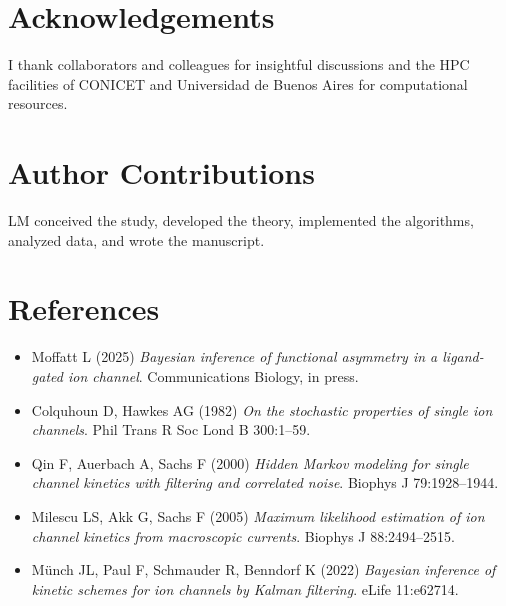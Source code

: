 \documentclass[9pt]{elife}
\begin{document}
\section*{Acknowledgements}
I thank collaborators and colleagues for insightful discussions and the HPC facilities of CONICET and Universidad de Buenos Aires for computational resources.

\section*{Author Contributions}
LM conceived the study, developed the theory, implemented the algorithms, analyzed data, and wrote the manuscript.

\section*{References}
\begin{itemize}
\item Moffatt L (2025) \emph{Bayesian inference of functional asymmetry in a ligand-gated ion channel}. Communications Biology, in press.
\item Colquhoun D, Hawkes AG (1982) \emph{On the stochastic properties of single ion channels}. Phil Trans R Soc Lond B 300:1--59.
\item Qin F, Auerbach A, Sachs F (2000) \emph{Hidden Markov modeling for single channel kinetics with filtering and correlated noise}. Biophys J 79:1928--1944.
\item Milescu LS, Akk G, Sachs F (2005) \emph{Maximum likelihood estimation of ion channel kinetics from macroscopic currents}. Biophys J 88:2494--2515.
\item Münch JL, Paul F, Schmauder R, Benndorf K (2022) \emph{Bayesian inference of kinetic schemes for ion channels by Kalman filtering}. eLife 11:e62714.
\end{itemize}
\end{document}
